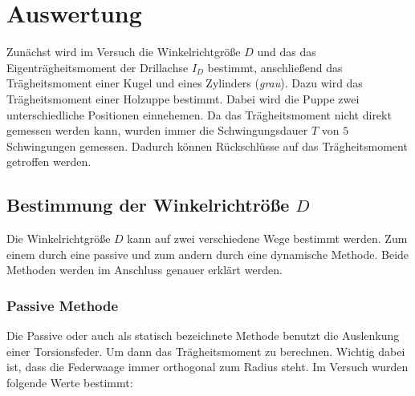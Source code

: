 \section{Auswertung}

Zunächst wird im Versuch die Winkelrichtgröße $D$ und das
das Eigenträgheitsmoment der Drillachse $I_D$ bestimmt, %
anschließend das Trägheitsmoment einer Kugel und eines Zylinders (\emph{grau}).
Dazu wird das Trägheitsmoment einer Holzuppe bestimmt. 
Dabei wird die Puppe zwei unterschiedliche Positionen einnehemen.%
Da das Trägheitsmoment nicht direkt gemessen werden kann, wurden immer
die Schwingungsdauer $T$ von $5$ Schwingungen gemessen.
Dadurch können Rückschlüsse auf das Trägheitsmoment getroffen werden. %

\subsection{Bestimmung der Winkelrichtröße $D$}

Die Winkelrichtgröße $D$ kann auf zwei verschiedene Wege bestimmt werden.
Zum einem durch eine passive und zum andern durch eine dynamische Methode. %
Beide Methoden werden im Anschluss genauer erklärt werden.

\subsubsection{Passive Methode}

Die Passive oder auch als statisch bezeichnete Methode benutzt die Auslenkung 
einer Torsionsfeder. Um dann das Trägheitsmoment zu berechnen. %
Wichtig dabei ist, dass die Federwaage immer orthogonal zum Radius steht.
Im Versuch wurden folgende Werte bestimmt:



